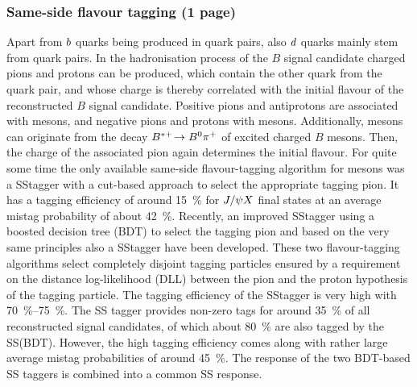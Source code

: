 
\subsubsection{Same-side flavour tagging (1 page)}
\label{sec:detecor:software:tagging:sstagger}

Apart from ${b}$ quarks being produced in \bbbar quark pairs, also
${d}$ quarks mainly stem from \ddbar quark pairs. In the hadronisation
process of the $B$ signal candidate charged pions and protons can be produced,
which contain the other quark from the \ddbar quark pair, and whose charge is
thereby correlated with the initial flavour of the reconstructed $B$ signal
candidate. Positive pions and antiprotons are associated with \Bz mesons, and
negative pions and protons with \Bzb mesons. Additionally, \Bd mesons can
originate from the decay $B^{*+}\!\rightarrow{\ensuremath{{B}^0}}{\ensuremath{{\pi}^+}}$ of excited charged $B$ mesons.
Then, the charge of the associated pion again determines the initial flavour.
For quite some time the only available same-side flavour-tagging algorithm for
\Bz mesons was a SS\pion tagger with a cut-based approach to select the
appropriate tagging pion. It has a tagging efficiency of around
\SI{15}{\percent} for $J/\psi X$ final states at an average mistag probability
of about \SI{42}{\percent}. Recently, an improved SS\pion tagger using a
boosted decision tree (BDT) to select the tagging pion and based on the very
same principles also a SS\proton tagger have been
developed\cite{CERN-THESIS-2015-040,LHCb-PAPER-2016-039}. These two
flavour-tagging algorithms select completely disjoint tagging particles
ensured by a requirement on the distance log-likelihood (DLL) between the pion
and the proton hypothesis of the tagging particle. The tagging efficiency of
the SS\pion tagger is very high with \SIrange{70}{75}{\percent}. The SS\proton
tagger provides non-zero tags for around \SI{35}{\percent} of all
reconstructed signal candidates, of which about \SI{80}{\percent} are also
tagged by the SS\pion (BDT). However, the high tagging efficiency comes along
with rather large average mistag probabilities of around \SI{45}{\percent}.
The response of the two BDT-based SS taggers is combined into a common SS
response.